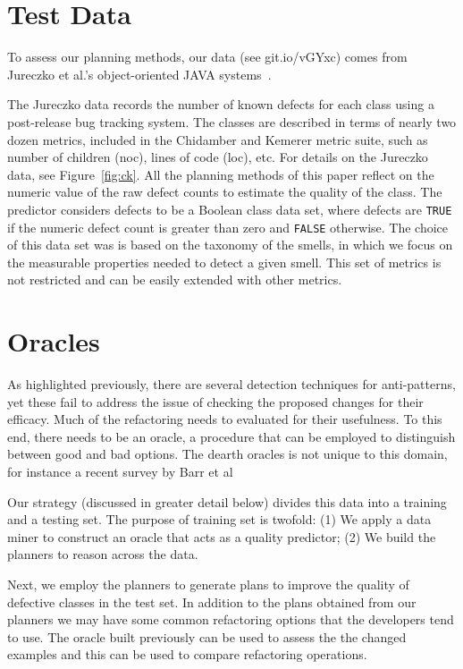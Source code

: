 \documentclass{sig-alternate}
\newcommand{\fig}[1]{Figure~\ref{fig:#1}}
\begin{document}
\section{Test Data}\label{sect:tesd}

To assess our planning methods, our data (see git.io/vGYxc) comes from Jureczko et al.'s object-oriented JAVA systems~\cite{jureczko10}.

The Jureczko data records the number of known defects for each class using a post-release bug tracking system. The classes are described in terms of nearly two dozen metrics, included in the Chidamber and Kemerer metric suite, such as number of children (noc), lines of code (loc), etc. For details on the Jureczko data, see  \fig{ck}. All the planning methods of this paper reflect on the numeric value of the raw defect counts to estimate the quality of the class. The predictor considers defects to be a Boolean class data set, where defects are \texttt{TRUE} if the numeric defect count is greater than zero and \texttt{FALSE} otherwise. The choice of this data set was is based on the taxonomy of the smells, in which we focus on the measurable properties needed to detect a given smell. This set of metrics is not restricted and can be easily extended with other metrics.

\section{Oracles}
\label{sect:eval}


As highlighted previously, there are several detection techniques for anti-patterns, yet these fail to address the issue of checking the proposed changes for their efficacy. Much of the refactoring needs to evaluated for their usefulness. To this end, there needs to be an oracle, a procedure that can be employed to distinguish between good and bad options. The dearth oracles is not unique to this domain, for instance a recent survey by Barr et al \cite{barr15}

Our strategy (discussed in greater detail below) divides this data into a training and a testing set. The purpose of training set is twofold: (1) We apply a data miner to construct an oracle that acts as a quality predictor; (2) We build the planners to reason across the data. 

Next, we employ the planners to generate plans to improve the quality of defective classes in the test set. In addition to the plans obtained from our planners we may have some common refactoring options that the developers tend to use. The oracle built previously can be used to assess the the changed examples and this can be used to compare refactoring operations.
\end{document}
